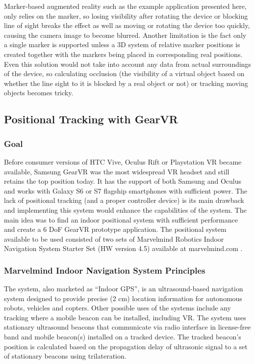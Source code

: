 \documentclass[12pt, a4paper]{article}
\begin{document}
Marker-based augmented reality such as the example application presented here, only relies on the marker, so losing visibility after rotating the device or blocking line of sight breaks the effect as well as moving or rotating the device too quickly, causing the camera image to become blurred. Another limitation is the fact only a single marker is supported unless a 3D system of relative marker positions is created together with the markers being placed in corresponding real positions. Even this solution would not take into account any data from actual surroundings of the device, so calculating occlusion (the visibility of a virtual object based on whether the line sight to it is blocked by a real object or not) or tracking moving objects becomes tricky.

\subsection{Positional Tracking with GearVR}
\subsubsection{Goal}
Before consumer versions of HTC Vive, Oculus Rift or Playstation VR became available, Samsung GearVR was the most widespread VR headset and still retains the top position today. It has the support of both Samsung and Oculus and works with Galaxy S6 or S7 flagship smartphones with sufficient power. The lack of positional tracking (and a proper controller device) is its main drawback and implementing this system would enhance the capabilities of the system. The main idea was to find an indoor positional system with sufficient performance and create a 6 DoF GearVR prototype application. The positional system available to be used consisted of two sets of Marvelmind Robotics Indoor Navigation System Starter Set (HW version 4.5) available at marvelmind.com .

\subsubsection{Marvelmind Indoor Navigation System Principles}
The system, also marketed as “Indoor GPS”, is an ultrasound-based navigation system designed to provide precise (2 cm) location information for autonomous robots, vehicles and copters. Other possible uses of the systems include any tracking where a mobile beacon can be installed, including VR. The system uses stationary ultrasound beacons that communicate via radio interface in license-free band and mobile beacon(s) installed on a tracked device. The tracked beacon’s position is calculated based on the propagation delay of ultrasonic signal to a set of stationary beacons using trilateration.
\end{document}
